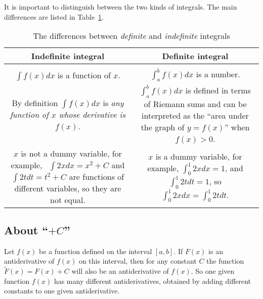 It is important to distinguish between the two kinds of integrals.
The main differences are listed in
Table~\ref{tbl:def-vs-indef-integrals}.

\begin{table}\sffamily
  \begin{tabular}{@{\extracolsep{2em}}cc}
    \toprule[2pt]
    \bfseries Indefinite integral & \bfseries Definite integral\\[2pt]
    \midrule \\
    $\int f(x) d x$ is a function of $x$.&
    $\int_a^bf(x)d x$ is a number. \\[1ex]
    \begin{minipage}[c]{160pt}
      By definition $\int f(x)d x$ is \textit{any function of $x$
        whose derivative is $f (x)$.}
    \end{minipage} &
    \begin{minipage}[c]{160pt}
      $\int_a^b f(x)d x$ is defined in terms of Riemann sums and can
      be interpreted as the ``area under the graph of $y=f(x)$'' when $f(x)>0$.
    \end{minipage}
    \\[1ex]
    \parbox[t]{160pt}{\vspace{1pt}

      $x$ is not a dummy variable, for example, 
      \ $\int 2xd x=x^2+C$ and $\int 2td t=t^2+C$ are
      functions of different variables, 
      so they are not equal.}&
    \parbox[t]{160pt}{\vspace{1pt}

      $x$ is a dummy variable, for example,  
      $\int_0^1 2xd x=1$, and $\int_0^1 2td t=1$, 
      so $\int_0^1 2xd x=\int_0^1 2td t$.}\\
    \bottomrule[2pt]

  \end{tabular}
  \bigskip
  
  \caption{The differences between \emph{definite} and
  \emph{indefinite} integrals}
  \label{tbl:def-vs-indef-integrals}
\end{table}

\subsection{About ``$+C$''} %
\label{sec:about-+c}
Let $f (x)$ be a function defined on the interval $[a,b]$.
If $F(x)$ is an antiderivative of $f(x)$ on this interval, then for
any constant $C$ the function $\tilde F(x)=F(x)+C$ will also be an
antiderivative of $f(x)$. So one given function $f(x)$ has many
different antiderivatives, obtained by adding different constants to
one given antiderivative.

